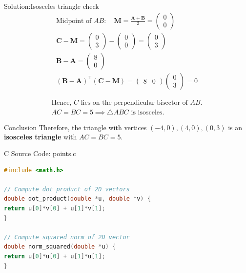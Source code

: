 \documentclass{beamer}
\numberwithin{equation}{section}
\newcommand{\myvec}[1]{\ensuremath{\begin{pmatrix}#1\end{pmatrix}}}
\let\vec\mathbf
\begin{document}
\begin{frame}{Solution:Isosceles triangle check}
    \begin{align}
\text{Midpoint of } AB: \quad \vec{M} = \frac{\vec{A}+\vec{B}}{2} = \myvec{0\\0} \\
\vec{C}-\vec{M} = \myvec{0\\3}-\myvec{0\\0} = \myvec{0\\3} \\
\vec{B}-\vec{A} = \myvec{8\\0} \\
(\vec{B}-\vec{A})^\top (\vec{C}-\vec{M}) = \myvec{8&0}\myvec{0\\3} = 0
\end{align}


\begin{align*}
\text{Hence, } C \text{ lies on the perpendicular bisector of } AB.\\
AC = BC = 5 \implies \triangle ABC \text{ is isosceles.}
\end{align*}

\end{frame}

\begin{frame}{Conclusion}
Therefore, the triangle with vertices $(-4,0), (4,0), (0,3)$ is an \textbf{isosceles triangle} with $AC = BC = 5$.    
\end{frame}

\begin{frame}[fragile]{C Source Code: points.c}
\begin{lstlisting}[language=C]
#include <math.h>

// Compute dot product of 2D vectors
double dot_product(double *u, double *v) {
return u[0]*v[0] + u[1]*v[1];
}

// Compute squared norm of 2D vector
double norm_squared(double *u) {
return u[0]*u[0] + u[1]*u[1];
}
\end{lstlisting}
\end{frame}
\end{document}
